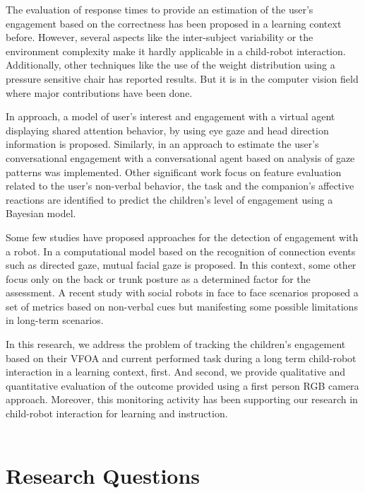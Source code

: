 \documentclass{sig-alternate}
\begin{document}
The evaluation of response times to provide an estimation of the user's engagement based on the correctness has been proposed in a learning context \cite{Beck} before. However, several aspects like the inter-subject variability or the environment complexity make it hardly applicable in a child-robot interaction. Additionally, other techniques \cite{Chipman07postureas} like the use of the weight distribution using a pressure sensitive chair has reported results. But it is in the computer vision field where major contributions have been done. 

In \cite{peters2010investigating} approach, a model of user's interest and engagement with a virtual agent displaying shared attention behavior, by using eye gaze and head direction information is proposed. Similarly, in \cite{nakano2010estimating} an approach to estimate the user's conversational engagement with a conversational agent based on analysis of gaze patterns was implemented. Other significant work \cite{Castellano:2009} focus on feature evaluation related to the user's non-verbal behavior, the task and the companion's affective reactions are identified to predict the children's level of engagement using a Bayesian model.

Some few studies have proposed approaches for the detection of engagement with a robot. In \cite{Rich:2010} a computational model based on the recognition of connection events such
as directed gaze, mutual facial gaze is proposed. In this context, some other \cite{Sanghvi:2011} focus only on the back or trunk posture as a determined factor for the assessment. A recent study \cite{anzalone} with social robots in face to face scenarios proposed a set of metrics based on non-verbal cues but manifesting some possible limitations in long-term scenarios.

In this research, we address the problem of tracking the children's engagement based on their VFOA and current performed task during a long term child-robot interaction in a learning context, first. And second, we provide qualitative and quantitative evaluation of the outcome provided using a first person RGB camera approach. Moreover, this monitoring activity has been supporting our research in child-robot interaction for learning and instruction.
\\\\

\section{Research Questions}
\end{document}
